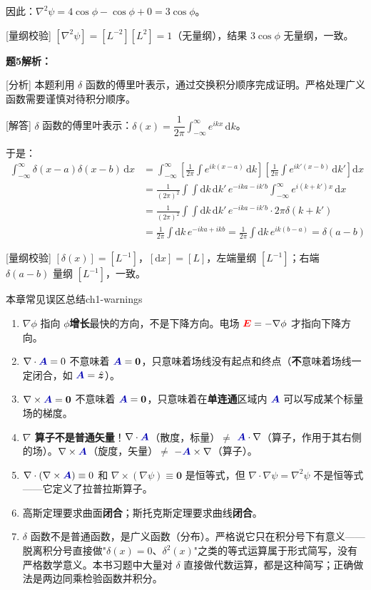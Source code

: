 \documentclass[11pt,a4paper,openany,oneside]{book}
\newcommand{\diff}{\mathrm{d}}
\newcommand{\vecE}{\textcolor{red}{\vect{E}}}
\newcommand{\vecA}{\textcolor{blue!70!black}{\vect{A}}}
\newcommand{\vect}[1]{\bm{#1}}
\newcommand{\unitvec}[1]{\hat{\vect{#1}}}
\newcommand{\grad}{\nabla}
\newcommand{\curl}{\nabla\times}
\newcommand{\divg}{\nabla\cdot}
\newcommand{\lap}{\nabla^2}
\begin{document}
因此：$\lap\psi = 4\cos\phi - \cos\phi + 0 = 3\cos\phi$。

[量纲校验] $[\lap\psi] = [L^{-2}][L^2] = 1$（无量纲），结果 $3\cos\phi$ 无量纲，一致。\qedsymbol

\textbf{题5解析：}

[分析] 本题利用 $\delta$ 函数的傅里叶表示，通过交换积分顺序完成证明。严格处理广义函数需要谨慎对待积分顺序。

[解答] $\delta$ 函数的傅里叶表示：$\delta(x) = \dfrac{1}{2\pi}\int_{-\infty}^{\infty} e^{ikx}\,\diff k$。

于是：
\begin{align*}
\int_{-\infty}^{\infty} \delta(x-a)\delta(x-b)\,\diff x &= \int_{-\infty}^{\infty} \left[\frac{1}{2\pi}\int e^{ik(x-a)}\,\diff k\right] \left[\frac{1}{2\pi}\int e^{ik'(x-b)}\,\diff k'\right] \diff x \\
&= \frac{1}{(2\pi)^2}\int\int\diff k\,\diff k'\, e^{-ika-ik'b} \int_{-\infty}^{\infty} e^{i(k+k')x}\,\diff x \\
&= \frac{1}{(2\pi)^2}\int\int\diff k\,\diff k'\, e^{-ika-ik'b} \cdot 2\pi\delta(k+k') \\
&= \frac{1}{2\pi}\int\diff k\, e^{-ika+ikb} = \frac{1}{2\pi}\int\diff k\, e^{ik(b-a)} = \delta(a-b)
\end{align*}

[量纲校验] $[\delta(x)] = [L^{-1}]$，$[\diff x] = [L]$，左端量纲 $[L^{-1}]$；右端 $\delta(a-b)$ 量纲 $[L^{-1}]$，一致。\qedsymbol



\begin{warning}{本章常见误区总结}{ch1-warnings}
\begin{enumerate}
\item $\grad\phi$ 指向 $\phi$\textbf{增长}最快的方向，不是下降方向。电场 $\vecE = -\grad\phi$ 才指向下降方向。
\item $\divg\vecA = 0$ 不意味着 $\vecA = \vect{0}$，只意味着场线没有起点和终点（\textbf{不}意味着场线一定闭合，如 $\vecA=\unitvec{z}$）。
\item $\curl\vecA = \vect{0}$ 不意味着 $\vecA = \vect{0}$，只意味着在\textbf{单连通}区域内 $\vecA$ 可以写成某个标量场的梯度。
\item \textbf{$\nabla$ 算子不是普通矢量}！$\nabla\cdot\vecA$（散度，标量）$\neq$ $\vecA\cdot\nabla$（算子，作用于其右侧的场）。$\nabla\times\vecA$（旋度，矢量）$\neq$ $-\vecA\times\nabla$（算子）。
\item $\nabla\cdot(\nabla\times\vecA) \equiv 0$ 和 $\nabla\times(\nabla\psi) \equiv \vect{0}$ 是恒等式，但 $\nabla\cdot\nabla\psi = \lap\psi$ 不是恒等式——它定义了拉普拉斯算子。
\item 高斯定理要求曲面\textbf{闭合}；斯托克斯定理要求曲线\textbf{闭合}。
\item $\delta$ 函数不是普通函数，是广义函数（分布）。严格说它只在积分号下有意义——脱离积分号直接做"$\delta(x) = 0$、$\delta^2(x)$"之类的等式运算属于形式简写，没有严格数学意义。本书习题中大量对 $\delta$ 直接做代数运算，都是这种简写；正确做法是两边同乘检验函数并积分。
\end{enumerate}
\end{warning}
\end{document}
